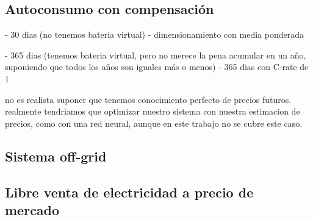 \subsection{Autoconsumo con compensación}
- 30 dias (no tenemos bateria virtual)
- dimensionamiento con media ponderada

- 365 dias (tenemos bateria virtual, pero no merece la pena acumular en un año, suponiendo que todos los años son iguales más o menos)
- 365 dias con C-rate de 1

no es realista suponer que tenemos conocimiento perfecto de precios futuros.
realmente tendriamos que optimizar nuestro sistema con nuestra estimacion
de precios, como con una red neural, aunque en este trabajo no se cubre este caso.

\subsection{Sistema off-grid}

\subsection{Libre venta de electricidad a precio de mercado}

